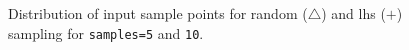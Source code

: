 \begin{figure}[htbp!]
  \centering
  \caption{Distribution of input sample points for random ($\triangle$)
    and lhs ($+$) sampling for \texttt{samples=5} and \texttt{10}.}
  \label{uq:figure02}
\end{figure}

